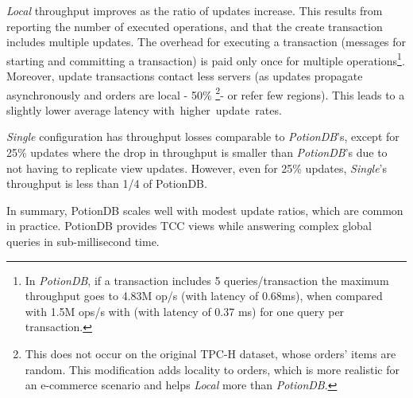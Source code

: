 \documentclass[sigplan,twocolumn,review,anonymous]{acmart}
\begin{document}
\textit{Local} throughput improves as the ratio of updates increase. This results from reporting
the number of executed operations, and that the create transaction includes multiple updates. 
The overhead for executing a transaction (messages for starting and committing a transaction) is paid
only once for multiple operations\footnote{In \textit{PotionDB}, if a transaction includes 5 queries/transaction the maximum throughput 
goes to 4.83M op/s (with latency of 0.68ms), when compared with 1.5M ops/s with (with latency of 0.37 ms) for one query per transaction.}.  
Moreover, update transactions contact less servers (as updates propagate asynchronously and 
orders are local - 50\% \footnote{This does not occur on the original TPC-H dataset, 
whose orders' items are random. This modification adds locality to orders, which is more realistic for 
an e-commerce scenario and helps \textit{Local} more than \textit{PotionDB}.}- or refer few regions). 
This leads to a slightly lower average latency \mbox{with higher update rates.}

\textit{Single} configuration has throughput losses comparable to \textit{PotionDB}'s, except for 25\% updates where the drop in throughput is smaller 
than \textit{PotionDB}'s due to not having to replicate view updates.
However, even for 25\% updates, \textit{Single}'s throughput is less than 1/4 of PotionDB.

In summary, PotionDB scales well with modest update ratios, which are common in practice.
PotionDB provides TCC views while answering complex global queries in sub-millisecond time.
\end{document}
